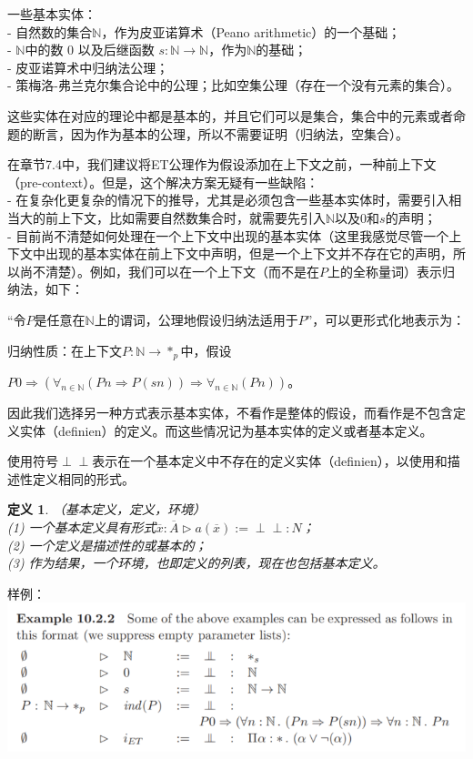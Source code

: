 \documentclass[UTF8]{article}
\newtheorem{thm}{定义}[section]
\newcommand{\dperp}{\perp\!\!\!\perp}
\begin{document}
		一些基本实体：\\
		- 自然数的集合$\mathbb{N}$，作为皮亚诺算术（Peano arithmetic）的一个基础；\\
		- $\mathbb{N}$中的数 0 以及后继函数 $s:\mathbb{N}\rightarrow\mathbb{N}$，作为$\mathbb{N}$的基础；\\
		- 皮亚诺算术中归纳法公理；\\
		- 策梅洛-弗兰克尔集合论中的公理；比如空集公理（存在一个没有元素的集合）。
		
		这些实体在对应的理论中都是基本的，并且它们可以是集合，集合中的元素或者命题的断言，因为作为基本的公理，所以不需要证明（归纳法，空集合）。
		
		在章节7.4中，我们建议将ET公理作为假设添加在上下文之前，一种前上下文（pre-context）。但是，这个解决方案无疑有一些缺陷：\\
		- 在复杂化更复杂的情况下的推导，尤其是必须包含一些基本实体时，需要引入相当大的前上下文，比如需要自然数集合时，就需要先引入$\mathbb{N}$以及0和$s$的声明；\\
		- 目前尚不清楚如何处理在一个上下文中出现的基本实体（这里我感觉尽管一个上下文中出现的基本实体在前上下文中声明，但是一个上下文并不存在它的声明，所以尚不清楚）。例如，我们可以在一个上下文（而不是在$P$上的全称量词）表示归纳法，如下：
		
		“令$P$是任意在$\mathbb{N}$上的谓词，公理地假设归纳法适用于$P$”，可以更形式化地表示为：
		
		归纳性质：在上下文$P:\mathbb{N}\rightarrow*_p$中，假设
		
		$P0\Rightarrow(\forall_{n\in\mathbb{N}}(Pn\Rightarrow P(sn))\Rightarrow\forall_{n\in\mathbb{N}}(Pn))$。
	
		因此我们选择另一种方式表示基本实体，不看作是整体的假设，而看作是不包含定义实体（definien）的定义。而这些情况记为基本实体的定义或者基本定义。
		
		使用符号$\dperp$表示在一个基本定义中不存在的定义实体（definien），以使用和描述性定义相同的形式。
		
		\begin{thm}（基本定义，定义，环境）\\
			(1) 一个基本定义具有形式$\overline{x}:\overline{A}\triangleright a(\overline{x}):=\dperp:N$；\\
			(2) 一个定义是描述性的或基本的；\\
			(3) 作为结果，一个环境，也即定义的列表，现在也包括基本定义。
		\end{thm}
	
		样例：\\
		\includegraphics[width=0.93\linewidth]{"../imgs/10-1.png"}
		
\end{document}
